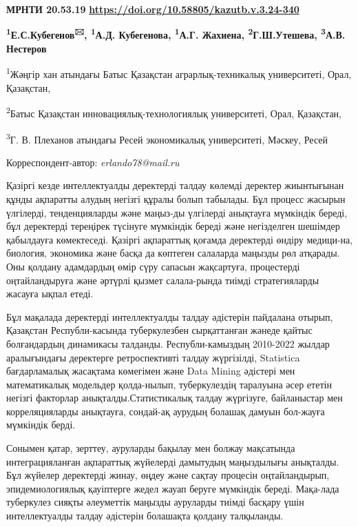 \newpage
{\bfseries МРНТИ 20.53.19}
\hfill {\bfseries \href{https://doi.org/10.58805/kazutb.v.3.24-340}{https://doi.org/10.58805/kazutb.v.3.24-340}}

\begin{center}

{\bfseries \textsuperscript{1}Е.С.Кубегенов\textsuperscript{🖂},
\textsuperscript{1}А.Д. Кубегенова, \textsuperscript{1}А.Г. Жахиена,
\textsuperscript{2}Г.Ш.Утешева, \textsuperscript{3}А.В. Нестеров}

\textsuperscript{1}Жәңгір хан атындағы Батыс Қазақстан
аграрлық-техникалық университеті, Орал, Қазақстан,

\textsuperscript{2}Батыс Қазақстан инновациялық-технологиялық
университеті, Орал, Қазақстан,

\textsuperscript{3}Г. В. Плеханов атындағы Ресей экономикалық
университеті, Мәскеу, Ресей
\end{center}
Корреспондент-автор: \emph{erlando78@mail.ru}\vspace{0.5cm}

Қазіргі кезде интеллектуалды деректерді талдау көлемді деректер
жиынтығынан құнды ақпаратты алудың негізгі құралы болып табылады. Бұл
процесс жасырын үлгілерді, тенденцияларды және маңыз-ды үлгілерді
анықтауға мүмкіндік береді, бұл деректерді тереңірек түсінуге мүмкіндік
береді және негізделген шешімдер қабылдауға көмектеседі. Қазіргі
ақпараттық қоғамда деректерді өндіру медици-на, биология, экономика және
басқа да көптеген салаларда маңызды рөл атқарады. Оны қолдану адамдардың
өмір сүру сапасын жақсартуға, процестерді оңтайландыруға және әртүрлі
қызмет салала-рында тиімді стратегияларды жасауға ықпал етеді.

Бұл мақалада деректерді интеллектуалды талдау әдістерін пайдалана
отырып, Қазақстан Республи-касында туберкулезбен сырқаттанған жәнеде
қайтыс болғандардың динамикасы талданды. Республи-камыздың 2010-2022
жылдар аралығындағы деректерге ретроспективті талдау жүргізілді,
Statistica бағдарламалық жасақтама көмегімен және Data Mining әдістері
мен математикалық модельдер қолда-нылып, туберкулездің таралуына әсер
ететін негізгі факторлар анықталды.Статистикалық талдау жүргізуге,
байланыстар мен корреляцияларды анықтауға, сондай-ақ аурудың болашақ
дамуын бол-жауға мүмкіндік берді.

Сонымен қатар, зерттеу, ауруларды бақылау мен болжау мақсатында
интеграцияланған ақпараттық жүйелерді дамытудың маңыздылығы анықталды.
Бұл жүйелер деректерді жинау, өңдеу және сақтау процесін оңтайландырып,
эпидемиологиялық қауіптерге жедел жауап беруге мүмкіндік береді.
Мақа-лада туберкулез сияқты әлеуметтік маңызды ауруларды тиімді басқару
үшін интеллектуалды талдау әдістерін болашақта қолдану талқыланды.


